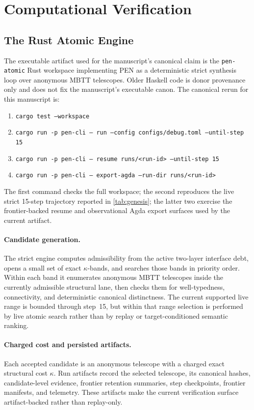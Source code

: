 \documentclass[11pt,a4paper]{article}
\theoremstyle{plain}
\theoremstyle{definition}
\theoremstyle{remark}
\begin{document}
\section{Computational Verification}
\label{sec:verification}

\subsection{The Rust Atomic Engine}

The executable artifact used for the manuscript's canonical claim is the \texttt{pen-atomic} Rust workspace implementing PEN as a deterministic strict synthesis loop over anonymous MBTT telescopes.
Older Haskell code is donor provenance only and does not fix the manuscript's executable canon.
The canonical rerun for this manuscript is:
\begin{enumerate}[nosep]
    \item \texttt{cargo test --workspace}
    \item \texttt{cargo run -p pen-cli -- run --config configs/debug.toml --until-step 15}
    \item \texttt{cargo run -p pen-cli -- resume runs/<run-id> --until-step 15}
    \item \texttt{cargo run -p pen-cli -- export-agda --run-dir runs/<run-id>}
\end{enumerate}
The first command checks the full workspace; the second reproduces the live strict 15-step trajectory reported in \cref{tab:genesis}; the latter two exercise the frontier-backed resume and observational Agda export surfaces used by the current artifact.

\paragraph{Candidate generation.}
The strict engine computes admissibility from the active two-layer interface debt, opens a small set of exact $\kappa$-bands, and searches those bands in priority order.
Within each band it enumerates anonymous MBTT telescopes inside the currently admissible structural lane, then checks them for well-typedness, connectivity, and deterministic canonical distinctness.
The current supported live range is bounded through step~15, but within that range selection is performed by live atomic search rather than by replay or target-conditioned semantic ranking.

\paragraph{Charged cost and persisted artifacts.}
Each accepted candidate is an anonymous telescope with a charged exact structural cost $\kappa$.
Run artifacts record the selected telescope, its canonical hashes, candidate-level evidence, frontier retention summaries, step checkpoints, frontier manifests, and telemetry.
These artifacts make the current verification surface artifact-backed rather than replay-only.
\end{document}

